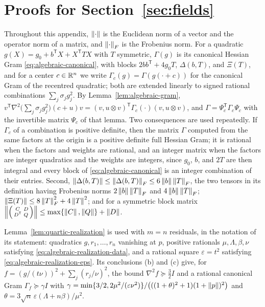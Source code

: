 \section{Proofs for Section~\ref{sec:fields}}
\label{app:fields}

Throughout this appendix, $\left\lVert\cdot\right\rVert$ is the Euclidean norm of a vector
and the operator norm of a matrix, and $\left\lVert\cdot\right\rVert_F$ is the Frobenius norm.
For a quadratic $g(X)=g_0+b^{\mathsf T}X+X^{\mathsf T}TX$ with $T$
symmetric, $\Gamma(g)$ is its canonical Hessian Gram
\eqref{eq:algebraic-canonical}, with blocks $2bb^{\mathsf T}+4g_0T$,
$\Delta(b,T)$, and $\Xi(T)$, and for a center $c\in\mathbb R^n$ we write
$\Gamma_c(g)=\Gamma(g(\cdot+c))$ for the canonical Gram of the recentred
quadratic; both are extended linearly to signed rational combinations
$\sum_j\sigma_jg_j^2$. By Lemma~\ref{lem:algebraic-gram},
$v^{\mathsf T}\nabla^2\bigl(\sum_j\sigma_jg_j^2\bigr)(c+u)v
=(v,u\otimes v)^{\mathsf T}\Gamma_c(\cdot)(v,u\otimes v)$, and
$\Gamma=\Psi_c^{\mathsf T}\Gamma_c\Psi_c$ with the invertible matrix $\Psi_c$
of that lemma. Two consequences are used repeatedly. If $\Gamma_c$ of a
combination is positive definite, then the matrix $\Gamma$ computed from the
same factors at the origin is a positive definite full Hessian Gram; it is
rational when the factors and weights are rational, and an integer matrix
when the factors are integer quadratics and the weights are integers, since
$g_0$, $b$, and $2T$ are then integral and every block of
\eqref{eq:algebraic-canonical} is an integer combination of their entries.
Second, $\left\lVert\Delta(b,T)\right\rVert\le\left\lVert\Delta(b,T)\right\rVert_F\le6\left\lVert b\right\rVert\left\lVert T\right\rVert_F$, the
two tensors in its definition having Frobenius norms $2\left\lVert b\right\rVert\left\lVert T\right\rVert_F$ and
$4\left\lVert b\right\rVert\left\lVert T\right\rVert_F$; $\left\lVert\Xi(T)\right\rVert\le8\left\lVert T\right\rVert_F^2+4\left\lVert T\right\rVert^2$; and for a
symmetric block matrix
$\left\lVert\left(\begin{smallmatrix}C&D\\D^{\mathsf T}&Q\end{smallmatrix}\right)\right\rVert
\le\max\{\left\lVert C\right\rVert,\left\lVert Q\right\rVert\}+\left\lVert D\right\rVert$.

Lemma~\ref{lem:quartic-realization} is used with $m=n$ residuals, in the
notation of its statement: quadratics $g,r_1,\ldots,r_n$ vanishing at $p$,
positive rationals $\mu,\Lambda,\beta,\nu$ satisfying
\eqref{eq:algebraic-realization-data}, and a rational square $\varepsilon=t^2$
satisfying \eqref{eq:algebraic-realization-eps}. Its conclusions (b) and (c)
give, for $f=(g/(t\nu))^2+\sum_j(r_j/\nu)^2$, the bound
$\nabla^2f\succeq\frac32I$ and a rational canonical Gram
$\Gamma_f\succeq\gamma I$ with
$\gamma=\min\{3/2,2\mu^2/(\varepsilon\nu^2)\}/
\bigl(((1+\theta)^2+1)(1+\left\lVert p\right\rVert)^2\bigr)$ and
$\theta=3\sqrt n\,\varepsilon(\Lambda+n\beta)/\mu^2$.

